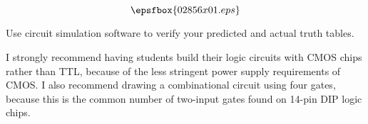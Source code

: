 

$$\epsfbox{02856x01.eps}$$

\vfil \eject






Use circuit simulation software to verify your predicted and actual truth tables.







I strongly recommend having students build their logic circuits with CMOS chips rather than TTL, because of the less stringent power supply requirements of CMOS.  I also recommend drawing a combinational circuit using four gates, because this is the common number of two-input gates found on 14-pin DIP logic chips.




